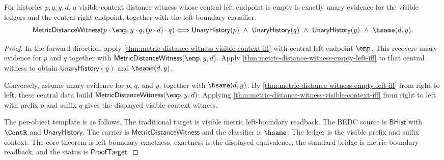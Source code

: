 \begin{theorem}
\label{thm:metric-distance-witness-left-boundary-visible-context-iff}
For histories $p,q,y,d$, a visible-context distance witness whose central left
endpoint is empty is exactly unary evidence for the visible ledgers and the
central right endpoint, together with the left-boundary classifier:
$$
\mathsf{MetricDistanceWitness}(p\cdot\emp,y\cdot q,(p\cdot d)\cdot q)
\Longleftrightarrow
\mathsf{UnaryHistory}(p)\ \wedge\ \mathsf{UnaryHistory}(q)\ \wedge\
\mathsf{UnaryHistory}(y)\ \wedge\ \hsame(d,y).
$$
\end{theorem}
\begin{proof}
In the forward direction, apply
\autoref{thm:metric-distance-witness-visible-context-iff} with central left
endpoint $\emp$. This recovers unary evidence for $p$ and $q$ together with
$\mathsf{MetricDistanceWitness}(\emp,y,d)$. Apply
\autoref{thm:metric-distance-witness-empty-left-iff} to that central witness to
obtain $\mathsf{UnaryHistory}(y)$ and $\hsame(d,y)$.

Conversely, assume unary evidence for $p$, $q$, and $y$, together with
$\hsame(d,y)$. By \autoref{thm:metric-distance-witness-empty-left-iff} from
right to left, these central data build
$\mathsf{MetricDistanceWitness}(\emp,y,d)$. Applying
\autoref{thm:metric-distance-witness-visible-context-iff} from right to left
with prefix $p$ and suffix $q$ gives the displayed visible-context witness.

The per-object template is as follows. The traditional target is visible metric
left-boundary readback. The BEDC source is $\mathsf{BHist}$ with $\ContR$ and
$\mathsf{UnaryHistory}$. The carrier is $\mathsf{MetricDistanceWitness}$ and the
classifier is $\hsame$. The ledger is the visible prefix and suffix context. The
core theorem is left-boundary exactness, exactness is the displayed equivalence,
the standard bridge is metric boundary readback, and the status is
$\mathsf{ProofTarget}$.
\end{proof}

